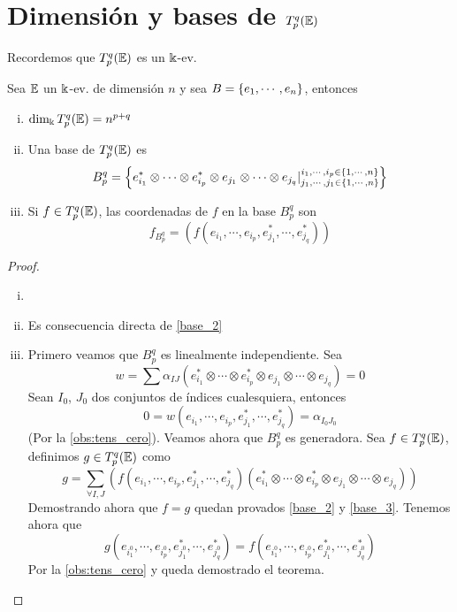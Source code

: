 \section{Dimensión y bases de $T_p^q(\E)$}

Recordemos que $T_p^q(\E)$ es un $\Bbbk$-ev.

\begin{teo}[(base de $T_p^q(\E)$)]
    Sea $\mathbb{E}$ un $\Bbbk$-ev. de dimensión $n$ y sea $B = \left\{e_1, \cdots, e_n\right\}$,
    entonces
\begin{enumerate}[i)]
        \item $\dim_\Bbbk T_p^q(\mathbb{E}) = n^{p+q}$
        \item \label{base_2} Una base de $T_p^q(\E)$ es
        \[
            B_p^q = \left\{ e_{i_1}^* \otimes \cdots \otimes e_{i_p}^* \otimes
            e_{j_1} \otimes \cdots \otimes e_{j_q} \vert
            \substack{i_1, \cdots, i_p \in \left\{1,\cdots,n\right\} \\
                j_1, \cdots, j_1 \in \left\{1,\cdots,n\right\}} \right\}
        \]
        \item \label{base_3} Si $f \in T_p^q(\mathbb{E})$, las coordenadas de $f$ en la base $B_p^q$ son
        \[
            f_{B_p^q} = (f(e_{i_1}, \cdots, e_{i_p}, e_{j_1}^*, \cdots, e_{j_q}^*))
        \]
    \end{enumerate}
\end{teo}
\begin{proof}
    \begin{enumerate}[i)]
        \item[]
        \item Es consecuencia directa de \ref{base_2}
        \item Primero veamos que $B_p^q$ es linealmente independiente. Sea
        \[
            w = \sum \alpha_{IJ}(e_{i_1}^* \otimes \cdots \otimes e_{i_p}^*
            \otimes e_{j_1} \otimes \cdots \otimes e_{j_q}) = 0
        \]
        Sean $I_0$, $J_0$ dos conjuntos de índices cualesquiera, entonces
        \[
            0 = w(e_{i_1}, \cdots, e_{i_p}, e_{j_1}^*, \cdots, e_{j_q}^*)
            = \alpha_{I_0J_0}
        \]
        (Por la \ref{obs:tens_cero}). Veamos ahora que $B_p^q$
        es generadora. Sea $f \in T_p^q(\mathbb{E})$, definimos $g \in T_p^q(\mathbb{E})$ como
        \[
            g = \sum_{\forall I,J} (f(e_{i_1}, \cdots, e_{i_p}, e_{j_1}^*, \cdots,
            e_{j_q}^*)(e_{i_1}^* \otimes \cdots \otimes e_{i_p}^* \otimes e_{j_1}
            \otimes \cdots \otimes e_{j_q}))
        \]
        Demostrando ahora que $f=g$ quedan provados \ref{base_2} y \ref{base_3}.
        Tenemos ahora que
        \[
            g(e_{i_1^0}, \cdots, e_{i_p^0}, e_{j_1^0}^*, \cdots, e_{j_q^0}^*) =
            f(e_{i_1^0}, \cdots, e_{i_p^0}, e_{j_1^0}^*, \cdots, e_{j_q^0}^*)
        \]
        Por la \ref{obs:tens_cero} y queda demostrado el teorema.
    \end{enumerate}
\end{proof}

